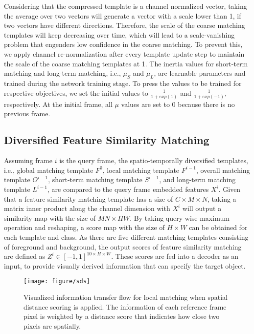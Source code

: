 \documentclass[runningheads]{llncs}
\begin{document}
Considering that the compressed template is a channel normalized vector, taking the average over two vectors will generate a vector with a scale lower than 1, if two vectors have different directions. Therefore, the scale of the coarse matching templates will keep decreasing over time, which will lead to a scale-vanishing problem that engenders low confidence in the coarse matching. To prevent this, we apply channel re-normalization after every template update step to maintain the scale of the coarse matching templates at 1. The inertia values for short-term matching and long-term matching, i.e., $\mu_S$ and $\mu_L$, are learnable parameters and trained during the network training stage. To press the values to be trained for respective objectives, we set the initial values to $\frac{1}{1 + exp(1)}$ and $\frac{1}{1 + exp(-1)}$, respectively. At the initial frame, all $\mu$ values are set to 0 because there is no previous frame.



\subsection{Diversified Feature Similarity Matching}
Assuming frame $i$ is the query frame, the spatio-temporally diversified templates, i.e., global matching template $F^0$, local matching template $F^{i-1}$, overall matching template $O^{i-1}$, short-term matching template $S^{i-1}$, and long-term matching template $L^{i-1}$, are compared to the query frame embedded features $X^i$. Given that a feature similarity matching template has a size of $C\times M\times N$, taking a matrix inner product along the channel dimension with $X^i$ will output a similarity map with the size of $MN \times HW$. By taking query-wise maximum operation and reshaping, a score map with the size of $H \times W$ can be obtained for each template and class. As there are five different matching templates consisting of foreground and background, the output scores of feature similarity matching are defined as $Z^i \in [-1, 1]^{10 \times H \times W}$. These scores are fed into a decoder as an input, to provide visually derived information that can specify the target object.



\begin{figure*}[t]
	\centering
	\texttt{[image: figure/sds]}
	\caption{Visualized information transfer flow for local matching when spatial distance scoring is applied. The information of each reference frame pixel is weighted by a distance score that indicates how close two pixels are spatially.}
	\label{figure2}
\end{figure*}
\end{document}
